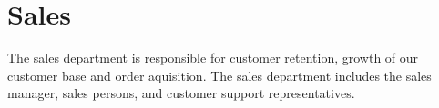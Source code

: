 \section{Sales}

The sales department is responsible for customer retention, growth of our customer base and order aquisition.  The sales department includes the sales manager, sales persons, and customer support representatives.

